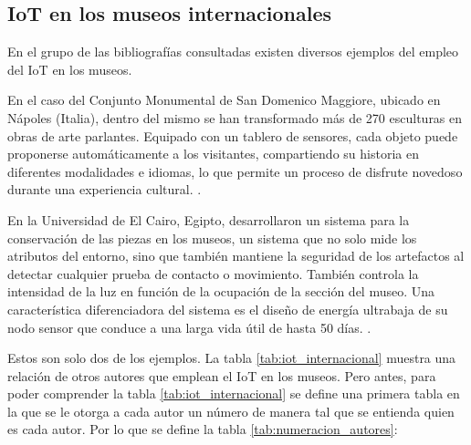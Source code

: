     \subsection{IoT en los museos internacionales}\label{sec:iotMundo}
        
        En el grupo de las bibliografías consultadas existen diversos ejemplos del empleo del IoT en los museos.

        En el caso del Conjunto Monumental de San Domenico Maggiore, ubicado en Nápoles (Italia), dentro del mismo se han transformado más de 270 esculturas en obras de arte parlantes. Equipado con un tablero de sensores, cada objeto puede proponerse automáticamente a los visitantes, compartiendo su historia en diferentes modalidades e idiomas, lo que permite un proceso de disfrute novedoso durante una experiencia cultural. \cite{monumentoSanDomenico}.
    
        En la Universidad de El Cairo, Egipto, desarrollaron un sistema para la conservación de las piezas en los museos, un sistema que no solo mide los atributos del entorno, sino que también mantiene la seguridad de los artefactos al detectar cualquier prueba de contacto o movimiento. También controla la intensidad de la luz en función de la ocupación de la sección del museo. Una característica diferenciadora del sistema es el diseño de energía ultrabaja de su nodo sensor que conduce a una larga vida útil de hasta 50 días. \cite{ultraLowPowerConservacion}.
    
        Estos son solo dos de los ejemplos. La tabla \ref{tab:iot_internacional} muestra una relación de otros autores que emplean el IoT en los museos. Pero antes, para poder comprender la tabla \ref{tab:iot_internacional} se define una primera tabla en la que se le otorga a cada autor un número de manera tal que se entienda quien es cada autor. Por lo que se define la tabla \ref{tab:numeracion_autores}:

